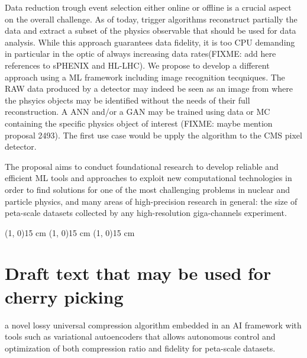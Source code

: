 Data reduction trough event selection either online or offline is a crucial aspect on the overall challenge. As of today, trigger algorithms reconstruct partially the data and extract a subset of the physics observable that should be used for data analysis. While this approach guarantees data fidelity, it is too CPU demanding in particular in the optic of always increasing data rates(FIXME: add here references to sPHENIX and HL-LHC). We propose to develop a different approach using a ML framework including image recognition tecqniques. The RAW data produced by a detector may indeed be seen as an image from where the phsyics objects may be identified without the needs of their full reconstruction. A ANN and/or a GAN may be trained using data or MC containing the specific physics object of interest (FIXME: maybe mention proposal 2493). The first use case would be upply the algorithm to the CMS pixel detector.
 

The proposal aims to conduct foundational research to develop reliable and efficient ML tools and approaches to exploit new computational technologies in order to find solutions for one of the most challenging problems in nuclear and particle physics, and many areas of high-precision research in general: the size of peta-scale datasets collected by any high-resolution giga-channels experiment. 
\clearpage





\line(1, 0){15 cm}
\line(1, 0){15 cm}
\line(1, 0){15 cm}
\section{Draft text that may be used for cherry picking}
a novel lossy universal compression algorithm embedded in an AI framework with tools such as variational autoencoders that allows autonomous control and optimization of both compression ratio and fidelity for peta-scale datasets.


